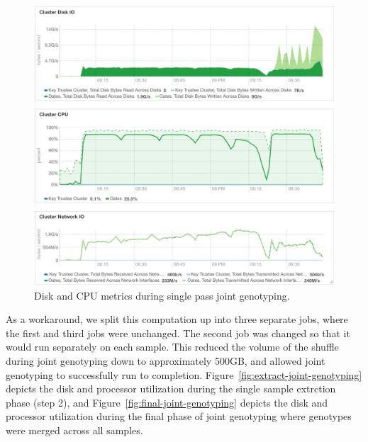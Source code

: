 \documentclass[phd]{ucbthesis}
\begin{document}
\begin{figure}[h]
  \begin{center}
    \includegraphics[width=0.95\linewidth]{graphs/jg-shuffle.png}
  \end{center}
  \caption{Disk and CPU metrics during single pass joint genotyping.}
  \label{fig:joint-genotyping}
\end{figure}

As a workaround, we split this computation up into three separate jobs, where
the first and third jobs were unchanged. The second job was changed so that it
would run separately on each sample. This reduced the volume of the shuffle
during joint genotyping down to approximately 500GB, and allowed joint
genotyping to successfully run to completion. Figure~\ref{fig:extract-joint-genotyping}
depicts the disk and processor utilization during the single sample extrction
phase (step 2), and Figure~\ref{fig:final-joint-genotyping} depicts the disk and
processor utilization during the final phase of joint genotyping where genotypes
were merged across all samples.
\end{document}
